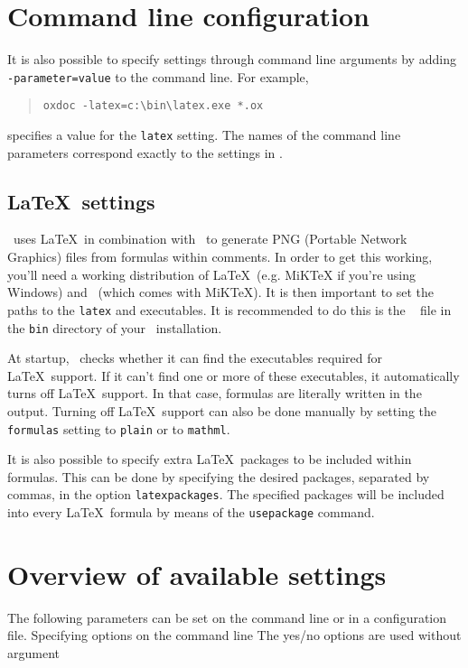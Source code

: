 \section{Command line configuration}
It is also possible to specify settings through command line arguments
by adding {\tt -parameter=value} to the command line. 
For example,
\begin{quote}
\small\begin{verbatim}
oxdoc -latex=c:\bin\latex.exe *.ox
\end{verbatim}
\end{quote}
specifies a value for the {\tt latex} setting. The names of the
command line parameters correspond exactly to the settings in 
\oxdocxml.

\subsection{\LaTeX~settings}
\oxdoc~uses \LaTeX~in combination with \dvipng~to generate PNG
(Portable Network Graphics) files from formulas within comments. In order to get this
working, you'll need a working distribution of \LaTeX~(e.g. MiKTeX
if you're using Windows) and \dvipng~(which comes with MiKTeX). It is then important
to set the paths to the {\tt latex} and \dvipng executables. It is recommended to do this is the \oxdocxml~
file in the {\tt bin} directory of your \oxdoc~installation.

At startup, \oxdoc~checks whether it can find the executables required for \LaTeX~support. If
it can't find one or more of these executables, it automatically turns off \LaTeX~support. In that case,
formulas are literally written in the output. Turning off \LaTeX~support can also be done manually by
setting the {\tt formulas} setting to {\tt plain} or to {\tt mathml}.

It is also possible to specify extra \LaTeX~packages to be included within formulas. This can be done
by specifying the desired packages, separated by commas, in the option {\tt latexpackages}.
The specified packages will be included into every \LaTeX~formula by means of the {\tt \bs usepackage}
command.



\section{Overview of available settings}
The following parameters can be set on the command line or in a configuration file. 
Specifying options on the command line 
The yes/no options are used without argument 
\medskip

